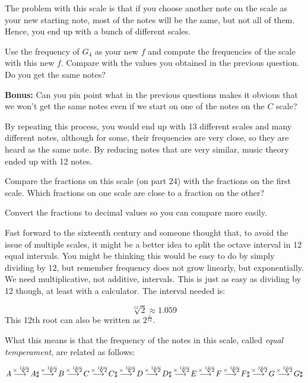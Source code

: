 \documentclass[12pt,noauthor,nooutcomes,hints,instructornotes]{ximera}%
\begin{document}
 The problem with this scale is that if you choose another note on the scale as your new starting note, most of the notes will be the same, but not all of them. Hence, you end up with a bunch of different scales. 
 
\begin{question}  Use the frequency of $G_4$ as your new $f$ and compute the frequencies of the scale with this new $f$. Compare with the values you obtained in the previous question. Do you get the same notes?\end{question} 
 
\textbf{Bonus:} Can you pin point what in the previous questions makes it obvious that we won't get the same notes even if we start on one of the notes on the $C$ scale?
 
By repeating this process, you would end up with 13 different scales and many different notes, although for some, their frequencies are very close, so they are heard as the same note. By reducing notes that are very similar, music theory ended up with 12 notes.


\begin{question} Compare the fractions on this scale (on part 24) with the fractions on the first scale. Which fractions on one scale are close to a fraction on the other?
\begin{hint}
Convert the fractions to decimal values so you can compare more easily.
\end{hint}
\end{question} 

Fast forward to the sixteenth century and someone thought that, to avoid the issue of multiple scales, it might be a better idea to split the octave interval in 12 equal intervals. You might be thinking this would be easy to do by simply dividing by 12, but remember frequency does not grow linearly, but exponentially. We need multiplicative, not additive, intervals. This is just as easy as dividing by 12 though, at least with a calculator. The interval needed is:

\[\sqrt[12]{2}\approx1.059
\]
This 12th root can also be written as $2^{\frac{1}{12}}$.

What this means is that the frequency of the notes in this scale, called \textit{equal temperament}, are related as follows:

\[
A \mathop{\longrightarrow\,}\limits^{\times\sqrt[12]{2}} A\sharp \mathop{\longrightarrow\,}\limits^{\times\sqrt[12]{2}} B \mathop{\longrightarrow\,}\limits^{\times\sqrt[12]{2}} C \mathop{\longrightarrow\,}\limits^{\times\sqrt[12]{2}} C\sharp \mathop{\longrightarrow\,}\limits^{\times\sqrt[12]{2}} D \mathop{\longrightarrow\,}\limits^{\times\sqrt[12]{2}} D\sharp 
\mathop{\longrightarrow\,}\limits^{\times\sqrt[12]{2}} E
\mathop{\longrightarrow\,}\limits^{\times\sqrt[12]{2}} F
\mathop{\longrightarrow\,}\limits^{\times\sqrt[12]{2}} F\sharp
\mathop{\longrightarrow\,}\limits^{\times\sqrt[12]{2}} G
\mathop{\longrightarrow\,}\limits^{\times\sqrt[12]{2}} G\sharp
\]
\end{document}
